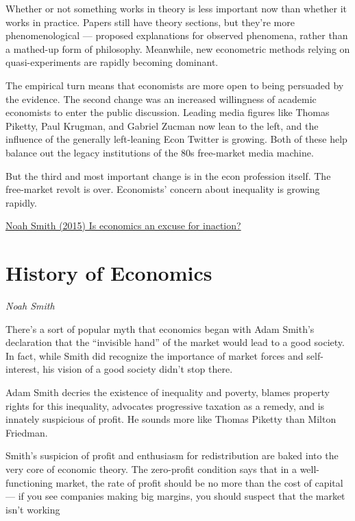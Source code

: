 \documentclass[
]{book}
\begin{document}
Whether or not something works in theory is less important now than whether it works in practice. Papers still have theory sections, but they're more phenomenological --- proposed explanations for observed phenomena, rather than a mathed-up form of philosophy. Meanwhile, new econometric methods relying on quasi-experiments are rapidly becoming dominant.

The empirical turn means that economists are more open to being persuaded by the evidence.
The second change was an increased willingness of academic economists to enter the public discussion. Leading media figures like Thomas Piketty, Paul Krugman, and Gabriel Zucman now lean to the left, and the influence of the generally left-leaning Econ Twitter is growing. Both of these help balance out the legacy institutions of the 80s free-market media machine.

But the third and most important change is in the econ profession itself. The free-market revolt is over. Economists' concern about inequality is growing rapidly.

\href{https://noahpinion.substack.com/p/is-economics-an-excuse-for-inaction}{Noah Smith (2015) Is economics an excuse for inaction?}

\hypertarget{history-of-economics}{%
\section{History of Economics}\label{history-of-economics}}

\emph{Noah Smith}

There's a sort of popular myth that economics began with Adam Smith's declaration that the ``invisible hand'' of the market would lead to a good society. In fact, while Smith did recognize the importance of market forces and self-interest, his vision of a good society didn't stop there.

Adam Smith decries the existence of inequality and poverty, blames property rights for this inequality, advocates progressive taxation as a remedy, and is innately suspicious of profit. He sounds more like Thomas Piketty than Milton Friedman.

Smith's suspicion of profit and enthusiasm for redistribution are baked into the very core of economic theory. The zero-profit condition says that in a well-functioning market, the rate of profit should be no more than the cost of capital --- if you see companies making big margins, you should suspect that the market isn't working
\end{document}
